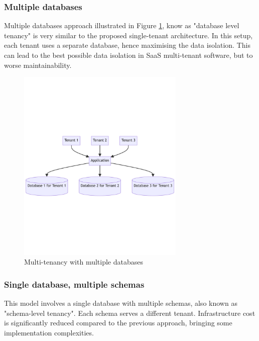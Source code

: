 \subsubsection{Multiple databases}
Multiple databases approach illustrated in Figure \ref{img04:multitenancy-multiple-databases}, know as "database level tenancy" is very similar to the proposed single-tenant architecture.
In this setup, each tenant uses a separate database, hence maximising the data isolation. 
This can lead to the best possible data isolation in \ac{SaaS} multi-tenant software, but to worse maintainability. 

\begin{figure}[p]\centering
\includegraphics[width=80mm]{img/chap04/fig_multitenancy_multiple_databases.png}
\caption{Multi-tenancy with multiple databases}
\label{img04:multitenancy-multiple-databases}
\end{figure}

\subsubsection{Single database, multiple schemas}

This model involves a single database with multiple schemas, also known as "schema-level tenancy".
Each schema serves a different tenant.
Infrastructure cost is significantly reduced compared to the previous approach, bringing some implementation complexities.


